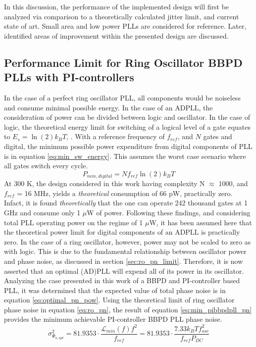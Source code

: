 In this discussion, the performance of the implemented design will first be analyzed via comparison to a theoretically calculated jitter limit, and current state of art. Small area and low power PLLs are considered for reference. Later, identified areas of improvement within the presented design are discussed.

\subsection{Performance Limit for Ring Oscillator BBPD PLLs with PI-controllers}\label{sec:fomjit_limit}
	In the case of a perfect ring oscillator PLL, all components would be noiseless and consume minimal possible energy. In the case of an ADPLL, the consideration of power can be divided between logic and oscillator. In the case of logic, the theoretical energy limit for switching of a logical level of a gate equates to $E_s = \ln(2) k_B T$, \cite{Lundstrom2006}. With a reference frequency of $f_{ref}$, and $N$ gates and digital, the minimum possible power expenditure from digital components of PLL is in equation \ref{eq:min_sw_energy}. This assumes the worst case scenario where all gates switch every cycle.
	\begin{equation}\label{eq:min_sw_energy}
		P_{min,digital} = Nf_{ref}\ln(2) k_B T
	\end{equation}
	At 300 K, the design considered in this work having complexity N $\approx$ 1000, and $f_{ref}$ = 16 MHz, yields a \textit{theoretical} consumption of 66 pW, practically zero. Infact, it is found \textit{theoretically} that the one can operate 242 thousand gates at 1 GHz and consume only 1 $\mu$W of power. Following these findings, and considering total PLL operating power on the regime of 1 $\mu$W, it has been assumed here that the theoretical power limit for digital components of an ADPLL is practically zero. In the case of a ring oscillator, however, power may not be scaled to zero as with logic. This is due to the fundamental relationship between oscillator power and phase noise, as discussed in section \ref{sec:ro_pn_limit}. Therefore, it is now asserted that an optimal (AD)PLL will expend all of its power in its oscillator. Analyzing the case presented in this work of a BBPD and PI-controller based PLL, it was determined that the expected value of total phase noise is in equation \ref{eq:optimal_pn_pow}. Using the theoretical limit of ring oscillator phase noise in equation \ref{eq:ro_pn}, the result of equation \ref{eq:min_pibbpdpll_pn} provides the minimum achievable PI-controller BBPD PLL phase noise.
	\begin{equation}\label{eq:min_pibbpdpll_pn}
		\sigma_{\Phi_{n,opt}}^2 = 81.9353\cdot \frac{\mathcal{L}_{min}(f)f^2}{f_{ref}} = 81.9353\cdot  \frac{7.33 k_B T f_{osc}^2}{f_{ref}P_{DC}}
	\end{equation}

